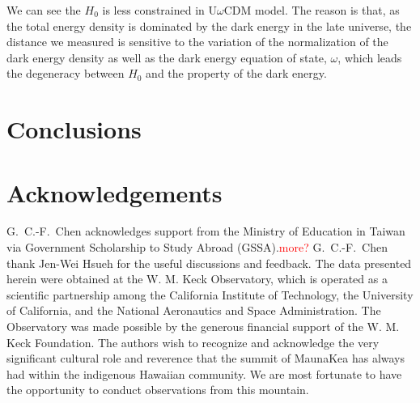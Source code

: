 \documentclass[useAMS,usenatbib]{mnras}
\newcommand\todo[1]{\textcolor{red}{#1}}
\def\dt{D_{\Delta t}}
\begin{document}
We can see the $H_{0}$ is less constrained in U$\omega$CDM model. The reason is that, as the total energy density is dominated by the dark energy in the late universe, the distance we measured is sensitive to the variation of the normalization of the dark energy density as well as the dark energy equation of state, $\omega$, which leads the degeneracy between $H_{0}$ and the property of the dark energy.




\section{Conclusions}
\label{sec:conclusion}

\section*{Acknowledgements}
G.~C.-F.~Chen acknowledges support from the Ministry of Education in Taiwan via Government Scholarship to Study Abroad (GSSA).\todo{more?} G.~C.-F.~Chen thank Jen-Wei Hsueh for the useful discussions and feedback. The data presented herein were obtained at the W. M. Keck Observatory, which is operated as a scientific partnership among the California Institute of Technology, the University of California, and the National Aeronautics and Space Administration. The Observatory was made possible by the generous financial support of the W. M. Keck Foundation. The authors wish to recognize and acknowledge the very significant cultural role and reverence that the summit of MaunaKea has always had within the indigenous Hawaiian community. We are most fortunate to have the opportunity to conduct observations from this mountain.


\end{document}
